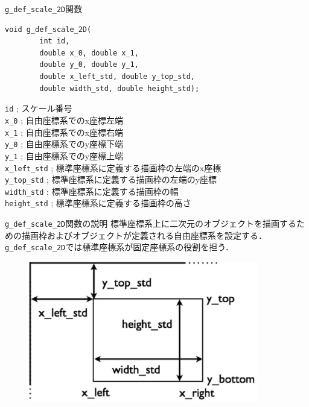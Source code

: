 \documentclass[platex,a4paper,12pt]{jsarticle}%
\begin{document}
\begin{itembox}[l]{\texttt{g\_def\_scale\_2D}関数}
\begin{verbatim}
void g_def_scale_2D(
        int id,
        double x_0, double x_1,
        double y_0, double y_1,
        double x_left_std, double y_top_std,
        double width_std, double height_std);
\end{verbatim}
\verb|id| ; スケール番号 \\
\verb|x_0| ; 自由座標系でのx座標左端 \\
\verb|x_1| ; 自由座標系でのx座標右端 \\
\verb|y_0| ; 自由座標系でのy座標下端 \\
\verb|y_1| ; 自由座標系でのy座標上端 \\
\verb|x_left_std| ; 標準座標系に定義する描画枠の左端のx座標 \\
\verb|y_top_std| ; 標準座標系に定義する描画枠の左端のy座標 \\
\verb|width_std| ; 標準座標系に定義する描画枠の幅 \\
\verb|height_std| ; 標準座標系に定義する描画枠の高さ
\end{itembox}

\begin{itembox}[l]{\texttt{g\_def\_scale\_2D}関数の説明}
標準座標系上に二次元のオブジェクトを描画するための描画枠およびオブジェクトが定義される自由座標系を設定する．
\verb|g_def_scale_2D|では標準座標系が固定座標系の役割を担う．
\end{itembox}

\begin{figure}[htb]
\centering
\includegraphics[width=100mm]{Canvas_g_def_scale_2D.eps}
\end{figure}
\end{document}
